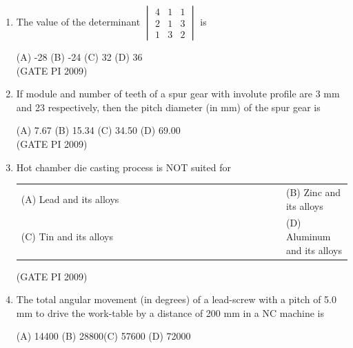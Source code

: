 \documentclass[journal,12pt,onecolumn]{IEEEtran}
\theoremstyle{remark}
\begin{document}
\begin{enumerate}[label=Q.\arabic*, leftmargin=*]
(A) $(1 + i^6)$ \hfill (B) $(9-i^8)$ \hfill (C) $(9+i^8)$ \hfill (D) $(17 + i^6)$ \\\

\hfill (GATE PI 2009)
\item The value of the determinant
$
\begin{vmatrix}
4 & 1 & 1 \\
2 & 1 & 3 \\
1 & 3 & 2
\end{vmatrix}
$
is

(A) -28 \hfill (B) -24 \hfill(C) 32 \hfill (D) 36 \\

\hfill (GATE PI 2009)

\item If module and number of teeth of a spur gear with involute profile are 3 mm and 23 respectively, then the pitch diameter (in mm) of the spur gear is

(A) 7.67 \hfill (B) 15.34 \hfill (C) 34.50 \hfill (D) 69.00  \\

\hfill (GATE PI 2009)
\item Hot chamber die casting process is NOT suited for
\begin{multicols}{2}
\begin{tabular}[t]{p{0.8\linewidth} p{0.9\linewidth}}
(A) Lead and its alloys & (B) Zinc and its alloys \\
(C) Tin and its alloys & (D) Aluminum and its alloys \\
\end{tabular}
\end{multicols}
\hfill (GATE PI 2009)
\item The total angular movement (in degrees) of a lead-screw with a pitch of 5.0 mm to drive the work-table by a distance of 200 mm in a NC machine is

(A) 14400 \hfill(B) 28800\hfill  (C) 57600 \hfill (D) 72000 \\
 

\end{enumerate}
\end{document}

